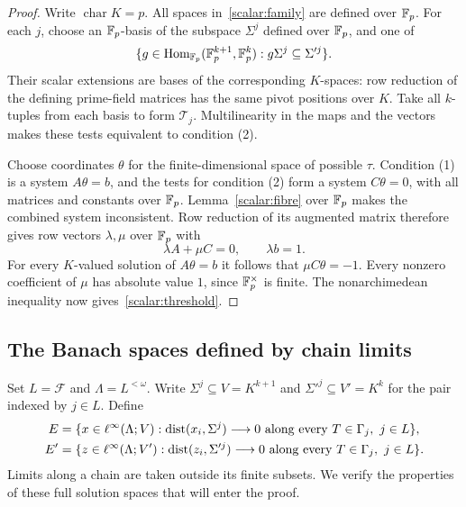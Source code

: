\begin{proof}
Write $\operatorname{char}K=p$. All spaces in~\eqref{scalar:family} are defined over $\mathbb F_p$.
For each $j$, choose an $\mathbb F_p$\nobreakdash-basis of the subspace $\Sigma^j$ defined over $\mathbb F_p$, and one of
\[
 \{g\in\operatorname{Hom}_{\mathbb F_p}(\mathbb F_p^{k+1},\mathbb F_p^k):g\Sigma^j\subseteq\Sigma'^j\}.
\]
Their scalar extensions are bases of the corresponding $K$\nobreakdash-spaces: row reduction of the
defining prime-field matrices has the same pivot positions over $K$. Take all $k$\nobreakdash-tuples from
each basis to form $\mathcal T_j$. Multilinearity in the maps and the vectors makes these tests equivalent
to condition (2).

Choose coordinates $\theta$ for the finite-dimensional space of possible $\tau$. Condition (1) is a
system $A\theta=b$, and the tests for condition (2) form a system $C\theta=0$, with all matrices and
constants over $\mathbb F_p$. Lemma~\ref{scalar:fibre} over $\mathbb F_p$ makes the combined system inconsistent.
Row reduction of its augmented matrix therefore gives row vectors $\lambda,\mu$ over $\mathbb F_p$ with
\[
 \lambda A+\mu C=0,\qquad \lambda b=1.
\]
For every $K$\nobreakdash-valued solution of $A\theta=b$ it follows that $\mu C\theta=-1$.
Every nonzero coefficient of $\mu$ has absolute value $1$, since $\mathbb F_p^\times$ is finite.
The nonarchimedean inequality now gives~\eqref{scalar:threshold}.
\end{proof}

\subsection{The Banach spaces defined by chain limits}

Set $L=\mathcal F$ and $\Lambda=L^{<\omega}$. Write $\Sigma^j\subseteq V=K^{k+1}$ and
$\Sigma'^j\subseteq V'=K^k$ for the pair indexed by $j\in L$. Define
\begin{equation}\label{scalar:spaces}
 \begin{split}
 E&=\{x\in\ell^\infty(\Lambda;V):
       \operatorname{dist}(x_i,\Sigma^j)\longrightarrow0
       \text{ along every }T\in\Gamma_j,\ j\in L\},\\
 E'&=\{z\in\ell^\infty(\Lambda;V'):
       \operatorname{dist}(z_i,\Sigma'^j)\longrightarrow0
       \text{ along every }T\in\Gamma_j,\ j\in L\}.
 \end{split}
\end{equation}
Limits along a chain are taken outside its finite subsets. We verify the properties of these full
solution spaces that will enter the proof.


